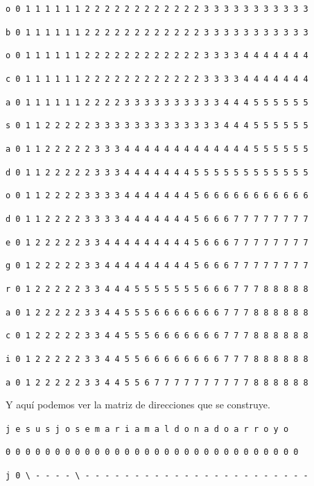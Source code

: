 \documentclass[11pt,a4paper]{article} %
\begin{document}
\texttt{o 0 1 1 1 1 1 1 2 2 2 2 2 2 2 2 2 2 2 2 3 3 3 3 3 3 3 3 3 3 3}

\texttt{b 0 1 1 1 1 1 1 2 2 2 2 2 2 2 2 2 2 2 2 3 3 3 3 3 3 3 3 3 3 3}

\texttt{o 0 1 1 1 1 1 1 2 2 2 2 2 2 2 2 2 2 2 2 3 3 3 3 4 4 4 4 4 4 4}

\texttt{c 0 1 1 1 1 1 1 2 2 2 2 2 2 2 2 2 2 2 2 3 3 3 3 4 4 4 4 4 4 4}

\texttt{a 0 1 1 1 1 1 1 2 2 2 2 3 3 3 3 3 3 3 3 3 3 4 4 4 5 5 5 5 5 5}

\texttt{s 0 1 1 2 2 2 2 2 3 3 3 3 3 3 3 3 3 3 3 3 3 4 4 4 5 5 5 5 5 5}

\texttt{a 0 1 1 2 2 2 2 2 3 3 3 4 4 4 4 4 4 4 4 4 4 4 4 4 5 5 5 5 5 5}

\texttt{d 0 1 1 2 2 2 2 2 3 3 3 4 4 4 4 4 4 4 5 5 5 5 5 5 5 5 5 5 5 5}

\texttt{o 0 1 1 2 2 2 2 3 3 3 3 4 4 4 4 4 4 4 5 6 6 6 6 6 6 6 6 6 6 6}

\texttt{d 0 1 1 2 2 2 2 3 3 3 3 4 4 4 4 4 4 4 5 6 6 6 7 7 7 7 7 7 7 7}

\texttt{e 0 1 2 2 2 2 2 3 3 4 4 4 4 4 4 4 4 4 5 6 6 6 7 7 7 7 7 7 7 7}

\texttt{g 0 1 2 2 2 2 2 3 3 4 4 4 4 4 4 4 4 4 5 6 6 6 7 7 7 7 7 7 7 7}

\texttt{r 0 1 2 2 2 2 2 3 3 4 4 4 5 5 5 5 5 5 5 6 6 6 7 7 7 8 8 8 8 8}

\texttt{a 0 1 2 2 2 2 2 3 3 4 4 5 5 5 6 6 6 6 6 6 6 7 7 7 8 8 8 8 8 8}

\texttt{c 0 1 2 2 2 2 2 3 3 4 4 5 5 5 6 6 6 6 6 6 6 7 7 7 8 8 8 8 8 8}

\texttt{i 0 1 2 2 2 2 2 3 3 4 4 5 5 6 6 6 6 6 6 6 6 7 7 7 8 8 8 8 8 8}

\texttt{a 0 1 2 2 2 2 2 3 3 4 4 5 5 6 7 7 7 7 7 7 7 7 7 7 8 8 8 8 8 8} \\

\normalsize

Y aquí podemos ver la matriz de direcciones que se construye.\\

\small

\hspace{1,72 em} \texttt{j e s u s j o s e m a r i a m a l d o n a d o a r r o y o}

\hspace{0,71 em} \texttt{0 0 0 0 0 0 0 0 0 0 0 0 0 0 0 0 0 0 0 0 0 0 0 0 0 0 0 0 0 0}

\texttt{j 0 \textbackslash{ }- - - - \textbackslash{ }- - - - - - - - - - - - - - - - - - - - - - -}
\end{document}
